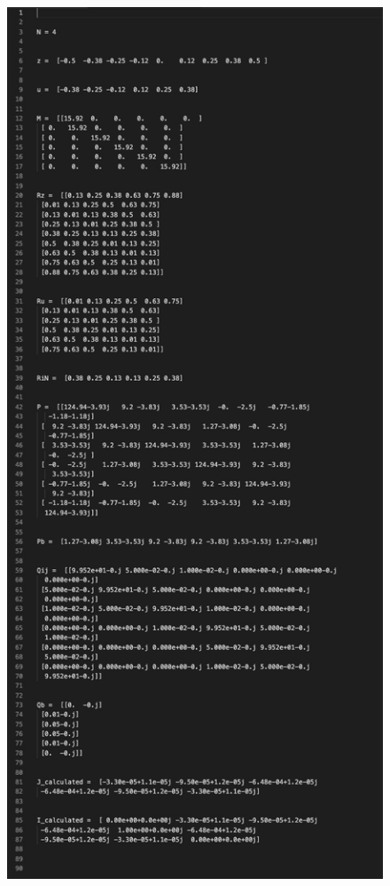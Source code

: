 \documentclass[11pt, a4paper]{article}
\begin{document}
\begin{figure}[H]
     \centering
     \includegraphics[scale=0.9]{Figure_3.png}
\end{figure}
\end{document}
